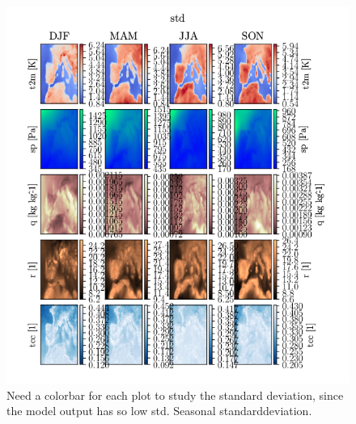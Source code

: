 \begin{figure}[ht]
    \centering
    \includegraphics{python_figs/seperate_colorbar_seasonal_std_all_variables.png}
    \caption{Need a colorbar for each plot to study the standard deviation, since the model output has so low std. Seasonal standarddeviation. }
    \label{fig:seasonal_std}
\end{figure}
